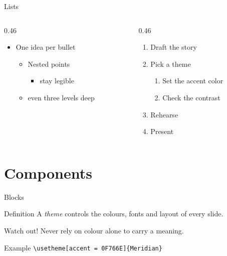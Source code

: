 \documentclass[11pt, aspectratio=169]{beamer}
\providecommand\ThemeName{Meridian}
\begin{document}
\begin{frame}{Lists}
    \begin{columns}[T]
        \begin{column}{0.46\textwidth}
            \begin{itemize}
                \item One idea per bullet
                \begin{itemize}
                    \item Nested points
                    \begin{itemize}
                        \item stay legible
                    \end{itemize}
                    \item even three levels deep
                \end{itemize}
            \end{itemize}
        \end{column}
        \begin{column}{0.46\textwidth}
            \begin{enumerate}
                \item Draft the story
                \item Pick a theme
                \begin{enumerate}
                    \item Set the accent color
                    \item Check the contrast
                \end{enumerate}
                \item Rehearse
                \item Present
            \end{enumerate}
        \end{column}
    \end{columns}
\end{frame}

\section{Components}

\begin{frame}{Blocks}
    \begin{block}{Definition}
        A \emph{theme} controls the colours, fonts and layout of every slide.
    \end{block}
    \begin{alertblock}{Watch out!}
        Never rely on colour alone to carry a meaning.
    \end{alertblock}
    \begin{exampleblock}{Example}
        \texttt{\textbackslash usetheme[accent = 0F766E]\{\ThemeName\}}
    \end{exampleblock}
\end{frame}
\end{document}

